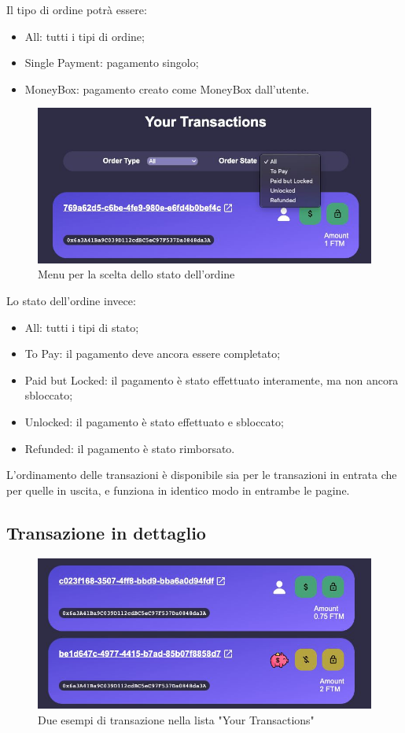 Il tipo di ordine potrà essere:
\begin{itemize}
    \item All: tutti i tipi di ordine;
    \item Single Payment: pagamento singolo;
    \item MoneyBox: pagamento creato come MoneyBox dall'utente.
\end{itemize}

\begin{figure}[H]
    \centering
    \includegraphics[scale=0.4]{immagini/orderstate.jpg}
    \caption{Menu per la scelta dello stato dell'ordine}
\end{figure}

Lo stato dell'ordine invece:
\begin{itemize}
    \item All: tutti i tipi di stato;
    \item To Pay: il pagamento deve ancora essere completato;
    \item Paid but Locked: il pagamento è stato effettuato interamente, ma non ancora sbloccato;
    \item Unlocked: il pagamento è stato effettuato e sbloccato;
    \item Refunded: il pagamento è stato rimborsato.
\end{itemize}

L'ordinamento delle transazioni è disponibile sia per le transazioni in entrata che per quelle in uscita, e funziona in identico modo in entrambe le pagine.

\subsection{Transazione in dettaglio}

\begin{figure}[H]
    \centering
    \includegraphics[scale=0.4]{immagini/transactionsmall.jpg}
    \caption{Due esempi di transazione nella lista "Your Transactions"}
\end{figure}

